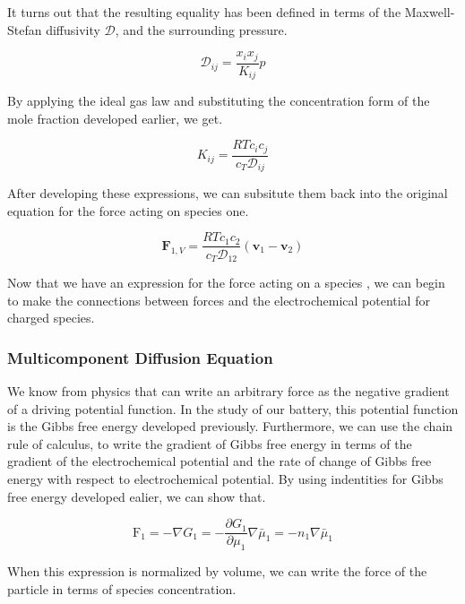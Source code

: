 \documentclass[lettersize,journal]{IEEEtran}
\begin{document}
It turns out that the resulting equality has been defined in terms of the Maxwell-Stefan diffusivity $\mathscr{D}$, and the surrounding pressure.

\begin{equation}
  \mathscr{D}_{i j}=\frac{x_{i} x_{j}}{K_{i j}} p
\end{equation}

By applying the ideal gas law and substituting the concentration form of the mole fraction developed earlier, we get.

\begin{equation}
  K_{i j}=\frac{R T c_{i} c_{j}}{c_{T} \mathscr{D}_{i j}}
\end{equation}

After developing these expressions, we can subsitute them back into the original equation for the force acting on species one.

\begin{equation}\label{friction_force_1}
  \mathbf{F}_{1, V}=\frac{R T c_{1} c_{2}}{c_{T} \mathscr{D}_{12}}\left(\mathbf{v}_{1}-\mathbf{v}_{2}\right)
\end{equation}

Now that we have an expression for the force acting on a species , we can begin to make the connections between forces and the electrochemical potential for charged species. \\


\subsubsection{Multicomponent Diffusion Equation}

We know from physics that can write an arbitrary force as the negative gradient of a driving potential function. In the study of our battery, this potential function is the Gibbs free energy developed previously. Furthermore, we can use the chain rule of calculus, to write the gradient of Gibbs free energy in terms of the gradient of the electrochemical potential and the rate of change of Gibbs free energy with respect to electrochemical potential. By using indentities for Gibbs free energy developed ealier, we can show that.

\begin{equation}
  \mathrm{F}_{1}=-\nabla G_{1}=-\frac{\partial G_{1}}{\partial \mu_{1}} \nabla \bar{\mu}_{1}=-n_{1} \nabla \bar{\mu}_{1}
\end{equation}

When this expression is normalized by volume, we can write the force of the particle in terms of species concentration.
\end{document}
